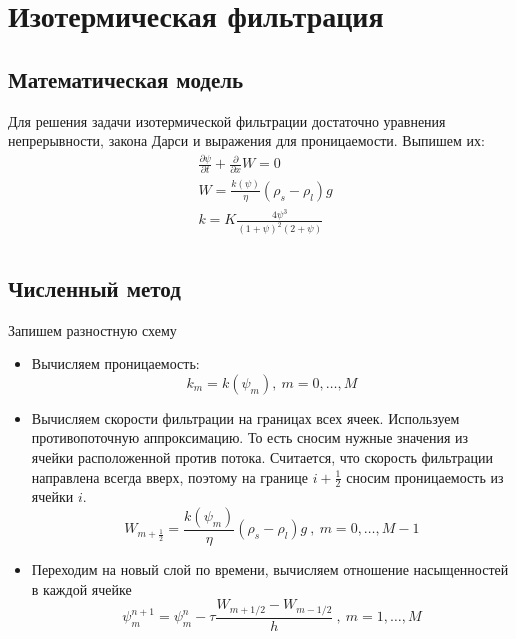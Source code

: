 \documentclass[12pt,a4paper]{article}
\newcommand{\pd}[2]{\frac{\partial #1}{\partial #2}}
\begin{document}
\section{Изотермическая фильтрация}
\subsection{Математическая модель}
Для решения задачи изотермической фильтрации достаточно уравнения непрерывности, закона Дарси и выражения для проницаемости. Выпишем их:
\begin{equation}
\begin{aligned}
&\pd{\psi}{t} + \pd{}{x}W = 0\\
&W= \frac{k(\psi)}{\eta}(\rho_s-\rho_l)g\\
&k = K \frac{4\psi^3}{(1+\psi)^2(2+\psi)}\\
\label{isotermal}
\end{aligned}
\end{equation}

\subsection{Численный метод}
Запишем разностную схему
\begin{itemize}
\item Вычисляем проницаемость:
\begin{equation}
k_m = k(\psi_m) , \ m = 0,  \dots ,M
\label{perm_razn}
\end{equation}

\item Вычисляем скорости фильтрации на границах всех ячеек. Используем противопоточную аппроксимацию. То есть сносим нужные значения из ячейки расположенной против потока. Считается, что скорость фильтрации направлена всегда вверх, поэтому на границе $i + \frac12$ сносим проницаемость из ячейки $i$.
\begin{equation}
W_{m+\frac12} = \frac{k(\psi_m)}{\eta}(\rho_s-\rho_l)g \ , \ m = 0,  \dots ,M-1
\label{Darsi_razn}
\end{equation}

\item Переходим на новый слой по времени, вычисляем отношение насыщенностей в каждой ячейке
\begin{equation}
\psi_m^{n+1} = \psi_m^n - \tau\frac{W_{m+1/2} - W_{m-1/2}}{h} \ , \ m = 1,  \dots ,M
\label{filtr_razn}
\end{equation}
\end{itemize}
\end{document}
